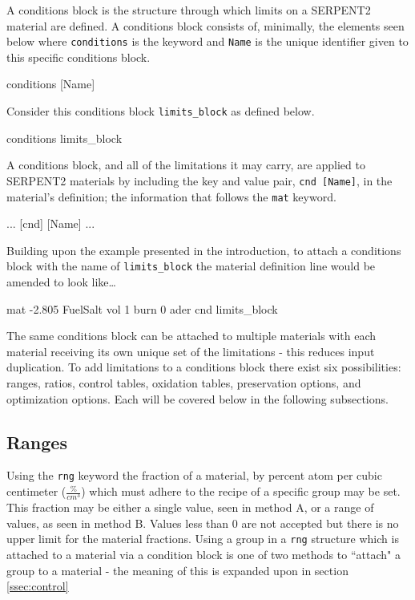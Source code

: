 A conditions block is the structure through which limits on a SERPENT2 material
are defined. A conditions block consists of, minimally, the elements seen 
below where \texttt{conditions} is the keyword and \texttt{Name} is the unique
identifier given to this specific conditions block.

\begin{lt}
conditions [Name]
\end{lt}

Consider this conditions block \texttt{limits\_block} as defined below.

\begin{li}
conditions limits_block
\end{li}

A conditions block, and all of the limitations it may carry, are applied to
SERPENT2 materials by including the key and value pair, \texttt{cnd [Name]}, in
the material's definition; the information that follows the \texttt{mat}
keyword.

\begin{lt}
... [cnd] [Name] ...
\end{lt}

Building upon the example presented in the introduction, to attach a
conditions block with the name of \texttt{limits\_block} the material definition
line would be amended to look like\ldots

\begin{li}
mat -2.805 FuelSalt vol 1 burn 0 ader cnd limits_block
\end{li}

The same conditions block can be attached to multiple materials with
each material receiving its own unique set of the limitations - this reduces
input duplication.
To add limitations to a conditions block there exist six possibilities: 
ranges, ratios, control tables, oxidation tables, preservation options, and 
optimization options. Each will be covered below in the following subsections.

\subsection{Ranges}\label{ssec:ranges}
Using the \texttt{rng} keyword the fraction of a material,
by percent atom per cubic centimeter ($\frac{\%}{cm^{3}}$) which must adhere
to the recipe of a specific group may be set. This fraction may be either a
single value, seen in method A, or a range of values, as seen in method B.
Values less than 0 are not accepted but there is no upper limit for the 
material fractions. Using a group in a \texttt{rng} structure which is attached
to a material via a condition block is one of two methods to ``attach" a group
to a material - the meaning of this is expanded upon in section 
\ref{ssec:control}


